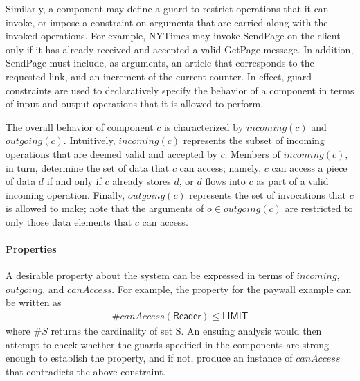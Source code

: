 Similarly, a component may define a guard to restrict operations that
it can invoke, or impose a constraint on arguments that are carried
along with the invoked operations. For example, \textsf{NYTimes} may
invoke \textsf{SendPage} on the client only if it has already received
and accepted a valid \textsf{GetPage} message. In addition,
\textsf{SendPage} must include, as arguments, an article that
corresponds to the requested link, and an increment of the current
counter.  In effect, guard constraints are used to
declaratively specify the behavior of a component in terms of input
and output operations that it is allowed to perform.

The overall behavior of component $c$ is characterized by
$incoming(c)$ and $outgoing(c)$. Intuitively, $incoming(c)$ represents
the subset of incoming operations that are deemed valid and accepted
by $c$. Members of $incoming(c)$, in turn, determine the set of data
that $c$ can access; namely, $c$ can access a piece of data $d$ if and
only if $c$ already stores $d$, or $d$ flows into $c$ as part of a
valid incoming operation. Finally, $outgoing(c)$ represents the set of
invocations that $c$ is allowed to make; note that the arguments of $o
\in outgoing(c)$ are restricted to only those data elements that $c$
can access.

\paragraph{\textbf{Properties}} A desirable property about the system
can be expressed in terms of $incoming$, $outgoing$, and
$canAccess$. For example, the property for the paywall example can be
written as
\begin{align*}
\# canAccess(\textsf{Reader}) \leq \textsf{LIMIT}
\end{align*}
where $\# S$ returns the cardinality of set S. An ensuing analysis
would then attempt to check whether the guards specified in the
components are strong enough to establish the property, and if not,
produce an instance of $canAccess$ that contradicts the above
constraint. 

%

